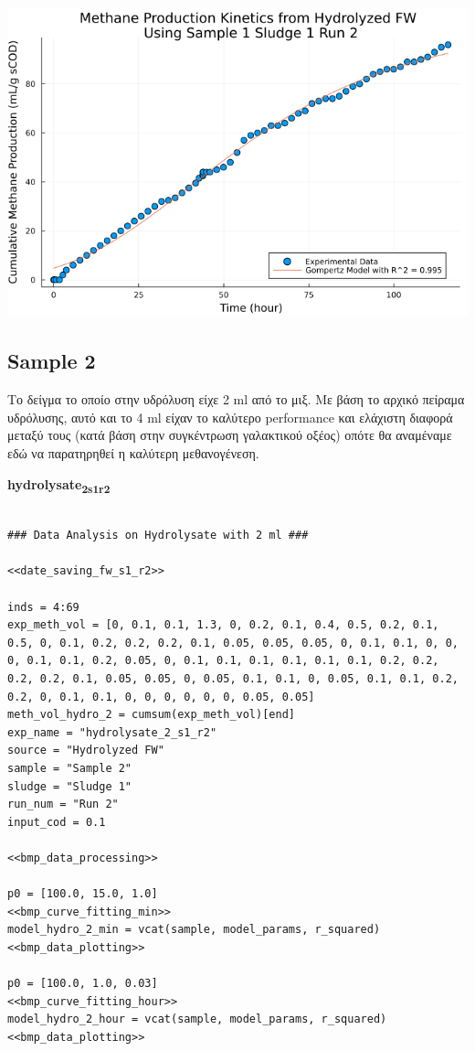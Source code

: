 \documentclass[11pt]{article}
\begin{document}
\begin{center}
\includegraphics[width=.9\linewidth]{../plots/BMPs/Hydrolyzed FW/methane_kinetics_hydrolysate_1_s1_r2_hour.png}
\end{center}

\subsection{Sample 2}
\label{sec:org539a107}
Το δείγμα το οποίο στην υδρόλυση είχε 2 ml από το μιξ. Με βάση το αρχικό πείραμα υδρόλυσης, αυτό και το 4 ml είχαν το καλύτερο performance και ελάχιστη διαφορά μεταξύ τους (κατά βάση στην συγκέντρωση γαλακτικού οξέος) οπότε θα αναμέναμε εδώ να παρατηρηθεί η καλύτερη μεθανογένεση.

\textbf{hydrolysate\textsubscript{2}\textsubscript{s1}\textsubscript{r2}}
\begin{verbatim}

### Data Analysis on Hydrolysate with 2 ml ###

<<date_saving_fw_s1_r2>>

inds = 4:69
exp_meth_vol = [0, 0.1, 0.1, 1.3, 0, 0.2, 0.1, 0.4, 0.5, 0.2, 0.1, 0.5, 0, 0.1, 0.2, 0.2, 0.2, 0.1, 0.05, 0.05, 0.05, 0, 0.1, 0.1, 0, 0, 0, 0.1, 0.1, 0.2, 0.05, 0, 0.1, 0.1, 0.1, 0.1, 0.1, 0.1, 0.2, 0.2, 0.2, 0.2, 0.1, 0.05, 0.05, 0, 0.05, 0.1, 0.1, 0, 0.05, 0.1, 0.1, 0.2, 0.2, 0, 0.1, 0.1, 0, 0, 0, 0, 0, 0, 0.05, 0.05]
meth_vol_hydro_2 = cumsum(exp_meth_vol)[end]
exp_name = "hydrolysate_2_s1_r2"
source = "Hydrolyzed FW"
sample = "Sample 2"
sludge = "Sludge 1"
run_num = "Run 2"
input_cod = 0.1

<<bmp_data_processing>>

p0 = [100.0, 15.0, 1.0]
<<bmp_curve_fitting_min>>
model_hydro_2_min = vcat(sample, model_params, r_squared)
<<bmp_data_plotting>>

p0 = [100.0, 1.0, 0.03]
<<bmp_curve_fitting_hour>>
model_hydro_2_hour = vcat(sample, model_params, r_squared)
<<bmp_data_plotting>>
\end{verbatim}
\end{document}
